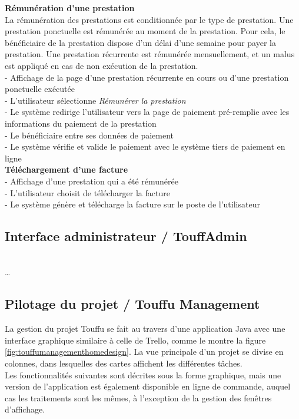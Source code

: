 \documentclass[conference]{IEEEtran}
\begin{document}
\textbf{Rémunération d'une prestation}\\
La rémunération des prestations est conditionnée par le type de prestation. Une prestation ponctuelle est rémunérée au moment de la prestation. Pour cela, le bénéficiaire de la prestation dispose d'un délai d'une semaine pour payer la prestation. Une prestation récurrente est rémunérée mensuellement, et un malus est appliqué en cas de non exécution de la prestation.\\

- Affichage de la page d'une prestation récurrente en cours ou d'une prestation ponctuelle exécutée\\
- L'utilisateur sélectionne \textit{Rémunérer la prestation}\\
- Le système redirige l'utilisateur vers la page de paiement pré-remplie avec les informations du paiement de la prestation\\
- Le bénéficiaire entre ses données de paiement\\
- Le système vérifie et valide le paiement avec le système tiers de paiement en ligne\\

\textbf{Téléchargement d'une facture}\hfil\\
- Affichage d'une prestation qui a été rémunérée\\
- L'utilisateur choisit de télécharger la facture\\
- Le système génère et télécharge la facture sur le poste de l'utilisateur\\

\subsection{Interface administrateur / TouffAdmin}\hfil\\
…

\subsection{Pilotage du projet / Touffu Management}

La gestion du projet Touffu se fait au travers d'une application Java avec une interface graphique similaire à celle de Trello, comme le montre la figure \ref{fig:touffumanagementhomedesign}. La vue principale d'un projet se divise en colonnes, dans lesquelles des cartes affichent les différentes tâches.\\
Les fonctionnalités suivantes sont décrites sous la forme graphique, mais une version de l'application est également disponible en ligne de commande, auquel cas les traitements sont les mêmes, à l'exception de la gestion des fenêtres d'affichage.
\end{document}
